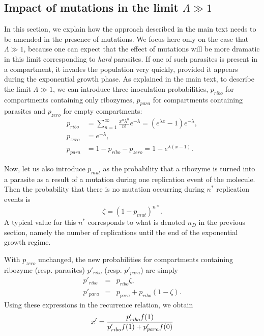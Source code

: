 \documentclass[twocolumn,showpacs,floatfix]{revtex4-1}
\newcommand{\be}{\begin{equation}}
\newcommand{\ee}{\end{equation}}
\newcommand{\bea}{\begin{eqnarray}}
\newcommand{\eea}{\end{eqnarray}}
\begin{document}
\begin{thebibliography}{99}
\begin{widetext}
\section{Impact of mutations in the limit $\Lambda\gg 1$}

In this section, we explain how the approach described in the main text needs to be amended in the presence of 
mutations. We focus here only on the case that $\Lambda\gg 1$, because one can expect that the effect of mutations will 
be more dramatic in this limit corresponding to {\it hard} parasites. 
If one of such parasites is present in a compartment, it invades the population very quickly, 
provided it appears during the exponential growth phase. 
As explained in the main text, to describe the limit $\Lambda\gg 1$, we can introduce three inoculation probabilities, $p_{ribo}$ 
for compartments containing only ribozymes, $p_{para}$ for compartments containing parasites and $p_{zero}$ for empty compartments:
\begin{equation}
\begin{split}
p_{ribo} &= \sum_{n=1}^{\infty} \frac{x^{n} \lambda^{n}}{n!} e^{-\lambda}=( e^{\lambda x} -1) e^{-\lambda}, \\
p_{zero} &= e^{-\lambda}, \\
p_{para} &= 1-p_{ribo}-p_{zero} = 1 -e^{\lambda (x-1)}.
\end{split}
\end{equation}

Now, let us also introduce $p_{mut}$ as the probability that a ribozyme is turned into a parasite as a result of a mutation 
during one replication event of the molecule. Then the probability that there is no mutation occurring during $n^*$ replication events is 
\be
\zeta=(1-p_{mut})^{n*}.
\ee
A typical value for this $n^*$ corresponds to what is denoted $n_D$ in the previous section, namely 
the number of replications until the end of the exponential growth regime. 

With $p_{zero}$ unchanged, the new probabilities for compartments 
containing ribozyme (resp. parasites) $p'_{ribo}$ (resp. $p'_{para}$) are simply
\bea
p'_{ribo} &=&p_{ribo} \zeta, \\
p'_{para}&=&p_{para}+p_{ribo}(1-\zeta).
\eea
Using these expressions in the recurrence relation, we obtain
\be
x' =  \frac{p'_{ribo} f(1)}{ p'_{ribo} f(1) + p'_{para} f(0)} \\
\ee


\end{widetext}
\end{thebibliography}
\end{document}
